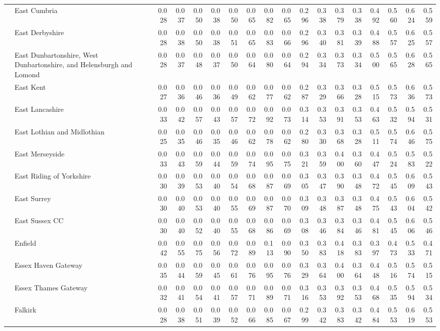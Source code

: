 \begin{tabular}{llrrrrrrrrrrrrrrrr}
 & East Cumbria & 0.028 & 0.037 & 0.050 & 0.038 & 0.050 & 0.065 & 0.082 & 0.065 & 0.296 & 0.338 & 0.379 & 0.338 & 0.492 & 0.560 & 0.624 & 0.559 \\
 & East Derbyshire & 0.028 & 0.038 & 0.050 & 0.038 & 0.051 & 0.065 & 0.083 & 0.066 & 0.296 & 0.340 & 0.381 & 0.339 & 0.488 & 0.557 & 0.625 & 0.557 \\
 & East Dunbartonshire, West Dunbartonshire, and Helensburgh and Lomond & 0.028 & 0.037 & 0.048 & 0.037 & 0.050 & 0.064 & 0.080 & 0.064 & 0.294 & 0.334 & 0.373 & 0.334 & 0.500 & 0.565 & 0.628 & 0.565 \\
 & East Kent & 0.027 & 0.036 & 0.046 & 0.036 & 0.049 & 0.062 & 0.077 & 0.062 & 0.287 & 0.329 & 0.366 & 0.328 & 0.515 & 0.573 & 0.636 & 0.573 \\
 & East Lancashire & 0.033 & 0.042 & 0.057 & 0.043 & 0.057 & 0.072 & 0.092 & 0.073 & 0.314 & 0.353 & 0.391 & 0.353 & 0.463 & 0.532 & 0.594 & 0.531 \\
 & East Lothian and Midlothian & 0.025 & 0.035 & 0.046 & 0.035 & 0.046 & 0.062 & 0.078 & 0.062 & 0.280 & 0.330 & 0.368 & 0.328 & 0.511 & 0.574 & 0.646 & 0.575 \\
 & East Merseyside & 0.033 & 0.043 & 0.059 & 0.044 & 0.059 & 0.074 & 0.095 & 0.075 & 0.321 & 0.359 & 0.400 & 0.360 & 0.447 & 0.524 & 0.583 & 0.522 \\
 & East Riding of Yorkshire & 0.030 & 0.039 & 0.053 & 0.040 & 0.054 & 0.068 & 0.087 & 0.069 & 0.305 & 0.347 & 0.390 & 0.348 & 0.472 & 0.545 & 0.609 & 0.543 \\
 & East Surrey & 0.030 & 0.040 & 0.053 & 0.040 & 0.055 & 0.069 & 0.087 & 0.070 & 0.309 & 0.348 & 0.387 & 0.348 & 0.475 & 0.543 & 0.604 & 0.542 \\
 & East Sussex CC & 0.030 & 0.040 & 0.052 & 0.040 & 0.055 & 0.068 & 0.086 & 0.069 & 0.308 & 0.346 & 0.384 & 0.346 & 0.481 & 0.545 & 0.606 & 0.546 \\
 & Enfield & 0.042 & 0.055 & 0.075 & 0.056 & 0.072 & 0.089 & 0.113 & 0.090 & 0.350 & 0.383 & 0.418 & 0.383 & 0.397 & 0.473 & 0.533 & 0.471 \\
 & Essex Haven Gateway & 0.035 & 0.044 & 0.059 & 0.045 & 0.061 & 0.076 & 0.095 & 0.076 & 0.329 & 0.364 & 0.400 & 0.364 & 0.448 & 0.516 & 0.574 & 0.515 \\
 & Essex Thames Gateway & 0.032 & 0.041 & 0.054 & 0.041 & 0.057 & 0.071 & 0.089 & 0.071 & 0.316 & 0.353 & 0.392 & 0.353 & 0.468 & 0.535 & 0.594 & 0.534 \\
 & Falkirk & 0.028 & 0.038 & 0.051 & 0.039 & 0.052 & 0.066 & 0.085 & 0.067 & 0.299 & 0.342 & 0.383 & 0.342 & 0.484 & 0.553 & 0.619 & 0.553 \\

\end{tabular}
